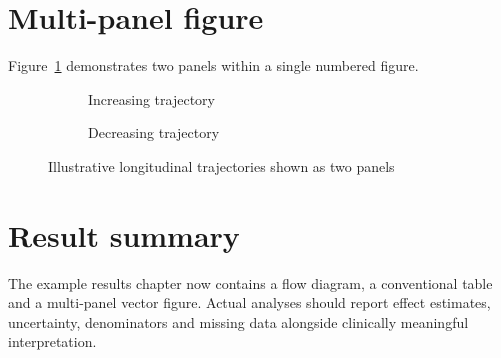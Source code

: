 \section{Multi-panel figure}
Figure~\ref{fig:two-panel} demonstrates two panels within a single numbered
figure.

\begin{figure}[htbp]
  \centering
  \begin{subfigure}[t]{0.46\textwidth}
    \centering
    \caption{Increasing trajectory}
  \end{subfigure}
  \hfill
  \begin{subfigure}[t]{0.46\textwidth}
    \centering
    \caption{Decreasing trajectory}
  \end{subfigure}
  \caption{Illustrative longitudinal trajectories shown as two panels}
  \label{fig:two-panel}
\end{figure}

\section{Result summary}
The example results chapter now contains a flow diagram, a conventional table
and a multi-panel vector figure. Actual analyses should report effect estimates,
uncertainty, denominators and missing data alongside clinically meaningful
interpretation.
